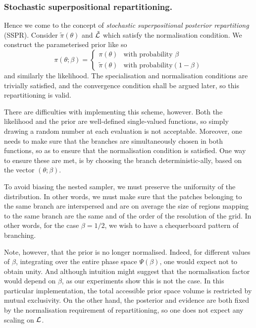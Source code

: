 \documentclass[usenatbib]{mnras}
\begin{document}
\subsubsection{Stochastic superpositional repartitioning.}
\label{sec:org0cdf2e5}

Hence we come to the concept of \emph{stochastic superpositional
posterior repartitiong} (SSPR). Consider \(\tilde{\pi}(\theta)\) and
\({\cal \tilde{L}}\) which satisfy the normalisation
condition. We construct the parameterised prior like so
\begin{equation}
  \pi(\theta; \beta)  = \begin{cases}
	\pi(\theta) & \text{with probability } \beta\\
	\tilde{\pi}(\theta) & \text{with probability} (1- \beta)
	\end{cases}
\end{equation}
and similarly the likelihood.  The specialisation and
normalisation conditions are trivially satisfied, and the
convergence condition shall be argued later, so this
repartitioning is valid.

There are difficulties with implementing this scheme,
however. Both the likelihood and the prior are well-defined
single-valued functions, so simply drawing a random number at each
evaluation is not acceptable. Moreover, one needs to make sure
that the branches are simultaneously chosen in both functions, so
as to ensure that the normalisation condition is satisfied. One
way to ensure these are met, is by choosing the branch
deterministic-ally, based on the vector \((\theta; \beta)\). 

To avoid biasing the nested sampler, we must preserve the
uniformity of the distribution. In other words, we must make sure
that the patches belonging to the same branch are interspersed and
are on average the size of regions mapping to the same branch are
the same and of the order of the resolution of the grid. In other
words, for the case \(\beta=1/2\), we wish to have a chequerboard
pattern of branching. 

Note, however, that the prior is no longer normalised. Indeed, for
different values of \(\beta\), integrating over the entire phase
space \(\Psi(\beta)\), one would expect not to obtain unity. And
although intuition might suggest that the normalisation factor
would depend on \(\beta\), as our experiments show this is not the
case. In this particular implementation, the total accessible
prior space volume is restricted by mutual exclusivity. On the
other hand, the posterior and evidence are both fixed by the
normalisation requirement of repartitioning, so one does not
expect any scaling on \({\cal L}\). 
\end{document}
